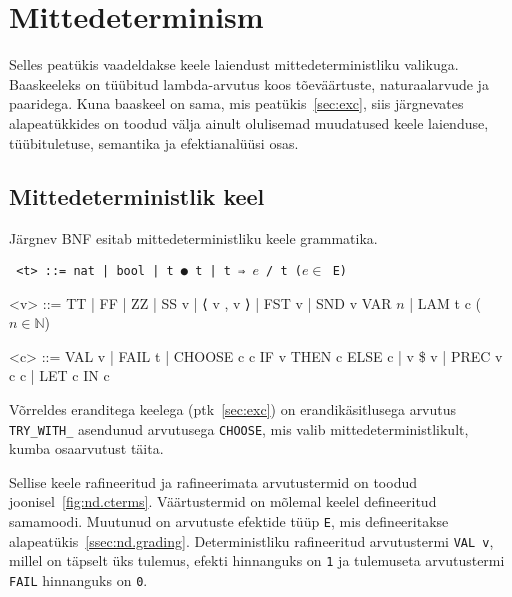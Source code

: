 \documentclass[a4paper,12pt]{article}
\begin{document}
\clearpage\vspace*{0pt}


\section{Mittedeterminism}

Selles peatükis vaadeldakse keele laiendust mittedeterministliku valikuga.
Baaskeeleks on tüübitud lambda-arvutus koos tõeväärtuste, naturaalarvude ja paaridega.
Kuna baaskeel on sama, mis peatükis~\ref{sec:exc}, siis järgnevates alapeatükkides on toodud välja ainult olulisemad muudatused keele laienduse, tüübituletuse, semantika ja efektianalüüsi osas.


\subsection{Mittedeterministlik keel}

Järgnev BNF esitab mittedeterministliku keele grammatika.
\begin{adjustwidth}{1em}{0pt}
\begin{grammar}\tt
<t> ::= nat | bool | t ● t | t ⇒ $e$ / t \hfill ($e \in$ E)
  
<v> ::= TT | FF | ZZ | SS v | ⟨ v , v ⟩ | FST v | SND v
    \alt VAR $n$ | LAM t c \hfill ($n \in \mathbb N$)
  
<c> ::= VAL v | FAIL t | CHOOSE c c
    \alt IF v THEN c ELSE c | v \$ v | PREC v c c | LET c IN c
\end{grammar}
\end{adjustwidth}

Võrreldes eranditega keelega (ptk~\ref{sec:exc}) on erandikäsitlusega arvutus {\tt TRY_WITH_} asendunud arvutusega {\tt CHOOSE}, mis valib mittedeterministlikult, kumba osaarvutust täita.

Sellise keele rafineeritud ja rafineerimata arvutustermid on toodud joonisel~\ref{fig:nd.cterms}.
Väärtustermid on mõlemal keelel defineeritud samamoodi.
Muutunud on arvutuste efektide tüüp {\tt E}, mis defineeritakse alapeatükis~\ref{ssec:nd.grading}.
Deterministliku rafineeritud arvutustermi {\tt VAL v}, millel on täpselt üks tulemus, efekti hinnanguks on {\tt 1} ja tulemuseta arvutustermi {\tt FAIL} hinnanguks on {\tt 0}.
\end{document}
